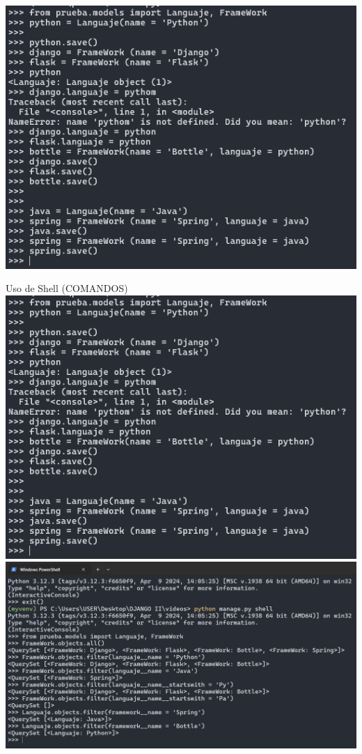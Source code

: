 \documentclass{article}
\begin{document}
        \includegraphics[width=1\textwidth,keepaspectratio]{IMAGENES/Evidencia Primer video IIi.png}
        \newline\newline \newline\newline 
        \item Uso de Shell (COMANDOS)
        \newline \newline\newline
        \includegraphics[width=1\textwidth,keepaspectratio]{IMAGENES/Evidencia Primer video IIi.png}
        \newline
        \includegraphics[width=1\textwidth,keepaspectratio]{IMAGENES/Evidencia Segundo Video I.png}
\end{document}
